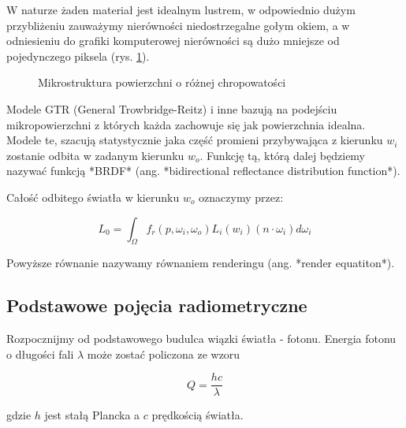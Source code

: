 \documentclass[../main.tex]{subfiles}
\begin{document}
W naturze żaden materiał jest idealnym lustrem, w odpowiednio dużym
przybliżeniu zauważymy nierówności niedostrzegalne gołym okiem, a w odniesieniu
do grafiki komputerowej nierówności są dużo mniejsze od pojedynczego piksela
(rys. \ref{fig:Microstructure}).

\begin{figure}[h]
  \centering
  \vspace{0.25cm}
  \caption{Mikrostruktura powierzchni o różnej chropowatości}
	\label{fig:Microstructure}
\end{figure}

Modele GTR (General Trowbridge-Reitz) i inne bazują na podejściu
mikropowierzchni z których każda zachowuje się jak powierzchnia idealna. Modele
te, szacują statystycznie jaka część promieni przybywająca z kierunku $w_i$
zostanie odbita w zadanym kierunku $w_o$. Funkcję tą, którą dalej będziemy
nazywać funkcją *BRDF* (ang. *bidirectional reflectance distribution
function*).

Całość odbitego światła w kierunku $w_o$ oznaczymy przez:

$$
L_0 = \int_{\Omega} {
    f_r(p, \omega_i, \omega_o)
    L_i(w_i)
    (n \cdot \omega_i)
    d \omega_i
}
$$

Powyższe równanie nazywamy równaniem renderingu (ang. *render equatiton*).

\subsection{Podstawowe pojęcia radiometryczne}

Rozpocznijmy od podstawowego budulca wiązki światła - fotonu. Energia fotonu
o długości fali $\lambda$ może zostać policzona ze wzoru

$$ Q = \frac{hc}{\lambda} $$

gdzie $h$ jest stałą Plancka a $c$ prędkością światła.
\end{document}
